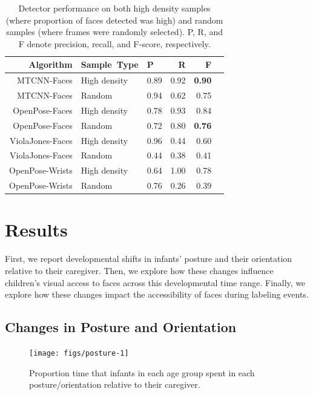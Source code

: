 \documentclass[10pt, letterpaper]{article}
\newenvironment{CodeChunk}{}{}
\begin{document}
\begin{table}[ht]
\centering
\begin{tabular}{rllrrr}
  \hline
   Algorithm & Sample\ Type & P & R & F \\ 
  \hline
  MTCNN-Faces & High density & 0.89 & 0.92 & \textbf{0.90} \\ 
  MTCNN-Faces & Random & 0.94 & 0.62 & 0.75 \\ 
  OpenPose-Faces & High density & 0.78 & 0.93 & 0.84 \\ 
  OpenPose-Faces & Random & 0.72 & 0.80 & \textbf{0.76} \\ 
  ViolaJones-Faces & High density & 0.96 & 0.44 & 0.60 \\ 
  ViolaJones-Faces & Random & 0.44 & 0.38 & 0.41 \\ 
  OpenPose-Wrists & High density & 0.64 & 1.00 & 0.78 \\ 
  OpenPose-Wrists & Random & 0.76 & 0.26 & 0.39 \\ 
   \hline
\end{tabular}
\caption{Detector performance on both high density samples (where proportion of faces detected was high) and random samples (where frames were randomly selected). P, R, and F denote precision, recall, and F-score, respectively.} 
\end{table}

\section{Results}\label{results}

First, we report developmental shifts in infants' posture and their
orientation relative to their caregiver. Then, we explore how these
changes influence children's visual access to faces across this
developmental time range. Finally, we explore how these changes impact
the accessibility of faces during labeling events.

\subsection{Changes in Posture and
Orientation}\label{changes-in-posture-and-orientation}

\begin{CodeChunk}
\begin{figure}[h]

{\centering \texttt{[image: figs/posture-1]} 

}

\caption[Proportion time that infants in each age group spent in each posture/orientation relative to their caregiver]{Proportion time that infants in each age group spent in each posture/orientation relative to their caregiver.}\label{fig:posture}
\end{figure}
\end{CodeChunk}
\end{document}
